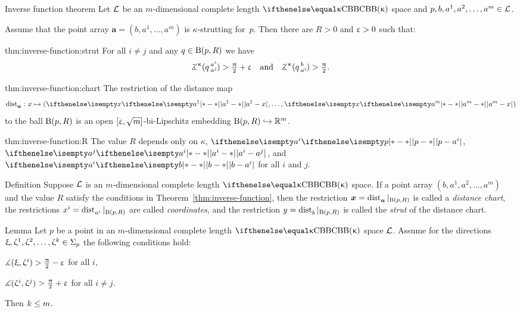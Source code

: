 \begin{thm}{Inverse function theorem}\label{thm:inverse-function}
Let $\mathcal{L}$ be an $m$-dimensional complete length $\Alex\kappa$ space 
and $p,b,a^1,a^2,\dots,a^m\in\spc{L}$.

Assume that the point array $\bm{a}=(b,a^1,\dots,a^m)$ is $\kappa$-strutting for~$p$.
Then
there are $R>0$ and $\upvarepsilon>0$ such that:

\begin{subthm}{thm:inverse-function:strut}
For all $i\ne j$ and any $q\in\oBall(p,R)$ we have
\[\angk\kappa{q}{a^i}{a^j}>\tfrac{\pi}{2}+\eps
\quad\text{and}\quad
\angk\kappa{q}{b}{a^i}>\tfrac{\pi}{2}.\]

\end{subthm}

\begin{subthm}{thm:inverse-function:chart}
The restriction of the distance map 
\[\distfun{\bm{a}}{}{}\:x\mapsto(\dist{a^1}{x}{},\dots,\dist{a^m}{x}{})\] 
to the ball $\mathrm{B}{}(p,R)$
is an open $[\upvarepsilon,\sqrt{m}]$-bi-Lipschitz embedding $\oBall(p,R)\hookrightarrow\RR^m$.
\end{subthm}

\begin{subthm}{thm:inverse-function:R}
The value $R$ depends only on $\kappa$, $\dist{p}{a^i}{}$, $\dist{a^i}{a^j}{}$, and $\dist{b}{a^i}{}$
for all $i$ and $j$.
\end{subthm}

\end{thm}

\begin{thm}{Definition}\label{def:dist-chart}
Suppose $\mathcal{L}$ is an $m$-dimensional complete length $\Alex\kappa$ space.
If a point array $(b,a^1,a^2,\dots,a^m)$ 
and the value $R$ satisfy the conditions in Theorem~\ref{thm:inverse-function}, 
then the restriction 
$\bm{x}=\mathop{\rm dist}\nolimits_{\bm{a}}^{{}}{}{}|_{\mathrm{B}{}(p,R)}$
is called a \emph{distance chart},
the restrictions $x^i=\mathop{\rm dist}\nolimits_{a^i}^{{}}{}{}|_{\mathrm{B}{}(p,R)}$ are called \emph{coordinates}, 
and the restriction $y=\mathop{\rm dist}\nolimits_{b}^{{}}{}{}|_{\mathrm{B}{}(p,R)}$ is called  the \emph{strut} of the distance chart.
\end{thm}

\begin{thm}{Lemma}\label{lem:pack(S^m)+}
Let $p$ be a point in an $m$-dimensional complete length $\Alex\kappa$ space $\mathcal{L}$.
Assume for the directions $\xi,\zeta^1,\zeta^2,\dots,\zeta^\kay\in\Sigma_p$ the following conditions hold: 

\begin{subthm}{}
$\measuredangle(\upxi,\upzeta^i)>\tfrac{\uppi}2-\upvarepsilon$ for all $i$,
\end{subthm}

\begin{subthm}{}
$\measuredangle(\upzeta^i,\upzeta^j)>\tfrac{\uppi}2+\upvarepsilon$ for all $i\ne j$.
\end{subthm}
Then $\kay\le m$.
\end{thm}

